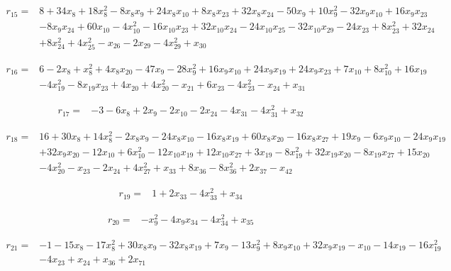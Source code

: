 \documentclass[10pt,letterpaper]{article}
\theoremstyle{remark}\newtheorem{remark}[theorem]{Remark}
\begin{document}
\begin{align*}
r_{15}={}&8+34x_{8}+18x_{8}^{2}-8x_{8}x_{9}+24x_{8}x_{10}+8x_{8}x_{23}+32x_{8}x_{24}-50x_{9}+10x_{9}^{2}-32x_{9}x_{10}+16x_{9}x_{23}\\
&-8x_{9}x_{24}+60x_{10}-4x_{10}^{2}-16x_{10}x_{23}+32x_{10}x_{24}-24x_{10}x_{25}-32x_{10}x_{29}-24x_{23}+8x_{23}^{2}+32x_{24}\\
&+8x_{24}^{2}+4x_{25}^{2}-x_{26}-2x_{29}-4x_{29}^{2}+x_{30}
\end{align*}

\begin{align*}
r_{16}={}&6-2x_{8}+x_{8}^{2}+4x_{8}x_{20}-47x_{9}-28x_{9}^{2}+16x_{9}x_{10}+24x_{9}x_{19}+24x_{9}x_{23}+7x_{10}+8x_{10}^{2}+16x_{19}\\
&-4x_{19}^{2}-8x_{19}x_{23}+4x_{20}+4x_{20}^{2}-x_{21}+6x_{23}-4x_{23}^{2}-x_{24}+x_{31}
\end{align*}

\begin{align*}
r_{17}={}&-3-6x_{8}+2x_{9}-2x_{10}-2x_{24}-4x_{31}-4x_{31}^{2}+x_{32}
\end{align*}

\begin{align*}
r_{18}={}&16+30x_{8}+14x_{8}^{2}-2x_{8}x_{9}-24x_{8}x_{10}-16x_{8}x_{19}+60x_{8}x_{20}-16x_{8}x_{27}+19x_{9}-6x_{9}x_{10}-24x_{9}x_{19}\\
&+32x_{9}x_{20}-12x_{10}+6x_{10}^{2}-12x_{10}x_{19}+12x_{10}x_{27}+3x_{19}-8x_{19}^{2}+32x_{19}x_{20}-8x_{19}x_{27}+15x_{20}\\
&-4x_{20}^{2}-x_{23}-2x_{24}+4x_{27}^{2}+x_{33}+8x_{36}-8x_{36}^{2}+2x_{37}-x_{42}
\end{align*}

\begin{align*}
r_{19}={}&1+2x_{33}-4x_{33}^{2}+x_{34}
\end{align*}

\begin{align*}
r_{20}={}&-x_{9}^{2}-4x_{9}x_{34}-4x_{34}^{2}+x_{35}
\end{align*}

\begin{align*}
r_{21}={}&-1-15x_{8}-17x_{8}^{2}+30x_{8}x_{9}-32x_{8}x_{19}+7x_{9}-13x_{9}^{2}+8x_{9}x_{10}+32x_{9}x_{19}-x_{10}-14x_{19}-16x_{19}^{2}\\
&-4x_{23}+x_{24}+x_{36}+2x_{71}
\end{align*}
\end{document}
